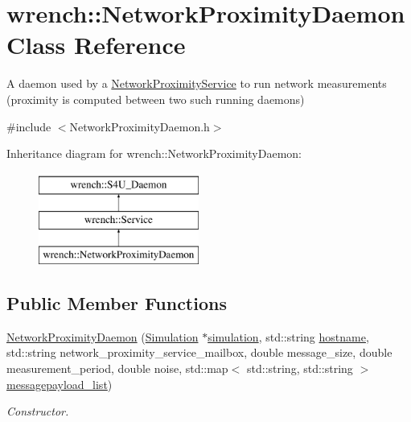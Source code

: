 \hypertarget{classwrench_1_1_network_proximity_daemon}{}\section{wrench\+:\+:Network\+Proximity\+Daemon Class Reference}
\label{classwrench_1_1_network_proximity_daemon}


A daemon used by a \hyperlink{classwrench_1_1_network_proximity_service}{Network\+Proximity\+Service} to run network measurements (proximity is computed between two such running daemons)  




{\ttfamily \#include $<$Network\+Proximity\+Daemon.\+h$>$}

Inheritance diagram for wrench\+:\+:Network\+Proximity\+Daemon\+:\begin{figure}[H]
\begin{center}
\leavevmode
\includegraphics[height=3.000000cm]{classwrench_1_1_network_proximity_daemon}
\end{center}
\end{figure}
\subsection*{Public Member Functions}
\begin{DoxyCompactItemize}
\item 
\hyperlink{classwrench_1_1_network_proximity_daemon_af9584c1e4c1c8197418b22d2b458f270}{Network\+Proximity\+Daemon} (\hyperlink{classwrench_1_1_simulation}{Simulation} $\ast$\hyperlink{classwrench_1_1_s4_u___daemon_a305beca7ad2fb650ad1492b7c95e93c4}{simulation}, std\+::string \hyperlink{classwrench_1_1_s4_u___daemon_a52bc0b9a6cd248310749dac086819f00}{hostname}, std\+::string network\+\_\+proximity\+\_\+service\+\_\+mailbox, double message\+\_\+size, double measurement\+\_\+period, double noise, std\+::map$<$ std\+::string, std\+::string $>$ \hyperlink{classwrench_1_1_service_a63865f20c92027ab626ab1347b0099d2}{messagepayload\+\_\+list})
\begin{DoxyCompactList}\small\item\em Constructor. \end{DoxyCompactList}\end{DoxyCompactItemize}
